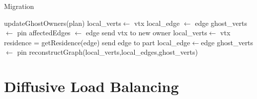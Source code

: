 \documentclass[a4paper]{article}
\begin{document}
\begin{algorithm}
\caption{Migration}\label{alg:migration}
\begin{algorithmic}
  \State updateGhostOwners(plan)
  \State local\_verts$\leftarrow$ vtx
  \State local\_edge $\leftarrow$ edge
  \EndIf
  \State ghost\_verts $\leftarrow$ pin
  \EndIf
  \EndFor
  \EndFor
  \EndIf
  \EndFor
  \State affectedEdges $\leftarrow$ edge
  \EndFor
  \EndFor
  \State send vtx to new owner
  \EndFor
  \State local\_verts$\leftarrow$ vtx
  \EndFor
  \State residence = getResidence(edge)
  \State send edge to part
  \EndFor
  \EndFor
  \State local\_edge$\leftarrow$edge
  \State ghost\_verts $\leftarrow$ pin
  \EndIf
  \EndFor
  \EndFor
  reconstructGraph(local\_verts,local\_edges,ghost\_verts)
  \EndProcedure
  
\end{algorithmic}
\end{algorithm}

\section{Diffusive Load Balancing}
\end{document}
